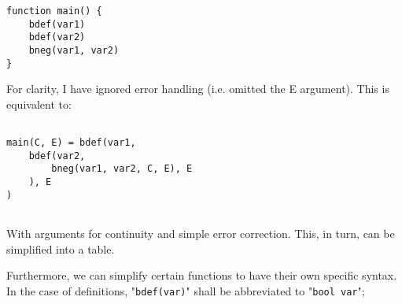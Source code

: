 \documentclass[Master.tex]{subfiles}
\begin{document}
\begin{lstlisting}
function main() {
	bdef(var1)
	bdef(var2)
	bneg(var1, var2)
}
\end{lstlisting}
For clarity, I have ignored error handling (i.e. omitted the E argument). This is equivalent to:

\begin{lstlisting}

main(C, E) = bdef(var1,
    bdef(var2,
        bneg(var1, var2, C, E), E
    ), E
)


\end{lstlisting}
With arguments for continuity and simple error correction. This, in turn, can be simplified into a table.

Furthermore, we can simplify certain functions to have their own specific syntax. In the case of definitions, "\lstinline{bdef(var)}" shall be abbreviated to "\lstinline{bool var}";
\end{document}
